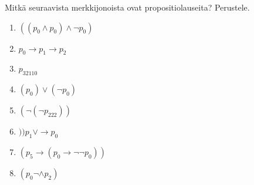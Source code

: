\documentclass[11pt,a4paper]{amsart}
\begin{document}
\begin{exercise}
Mitkä seuraavista merkkijonoista ovat propositiolauseita? Perustele.
\begin{enumerate}[label=\alph*), nosep]
\item \(((p_0 \land p_0) \land \neg p_0)\)
\item \(p_0 \rightarrow p_1 \rightarrow p_2\)
\item \(p_{32110}\)
\item \((p_0) \lor (\neg p_0)\)
\item \((\neg(\neg p_{222}))\)
\item \())p_1 \lor \rightarrow p_0\)
\item \((p_5 \rightarrow (p_0 \rightarrow \neg \neg p_0))\)
\item \((p_0 \neg \land p_2)\)
\end{enumerate}
\end{exercise}
\end{document}
